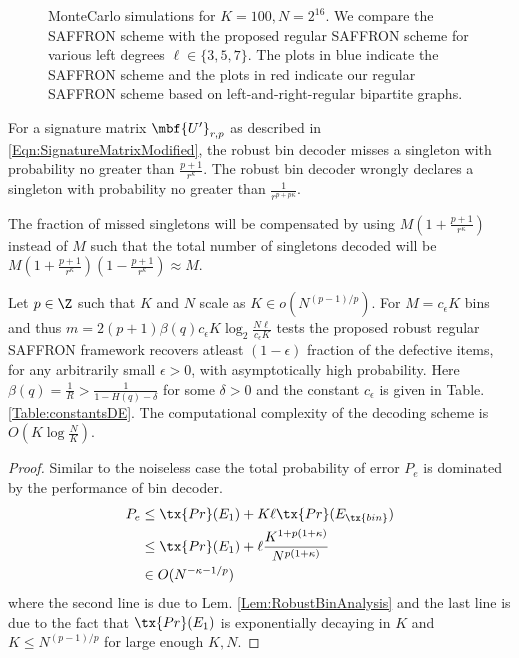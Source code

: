 \documentclass[conference,,twocolumn]{IEEEtran}
\newcommand*{\FigPath}{./Figures}
\def\ceps{c_{\epsilon}}
\begin{document}
\begin{figure}[t!]
\centering
\resizebox{\columnwidth}{!}{}
\caption{MonteCarlo simulations for $K=100, N=2^{16}$. We compare the SAFFRON scheme \cite{lee2015saffron} with the proposed regular SAFFRON scheme for various left degrees $\ell\in\{3,5,7\}$. 
The plots in blue indicate the SAFFRON scheme and the plots in red indicate our regular SAFFRON scheme based on left-and-right-regular bipartite graphs.}
\label{Fig:SimulationNoiseless}
\end{figure}

\begin{lemma}
\label{Lem:RobustBinAnalysis}
For a signature matrix $\mbf{U'}_{r,p}$ as described in \eqref{Eqn:SignatureMatrixModified}, the robust bin decoder misses a singleton with probability no greater than $\frac{p+1}{r^{\kappa}}$. The robust bin decoder wrongly declares a singleton with probability no greater than $\frac{1}{r^{p+p\kappa}}$.
\end{lemma}
The fraction of missed singletons will be compensated by using $M(1+\frac{p+1}{r^{\kappa}})$ instead of $M$ such that the total number of singletons decoded will be $M(1+\frac{p+1}{r^{\kappa}})(1-\frac{p+1}{r^{\kappa}})\approx M$.

\begin{theorem}
Let $p\in\Z$ such that $K$ and $N$ scale as $K\in o\left(N^{(p-1)/p}\right)$. For $M=\ceps K$ bins and thus $m=2(p+1)\beta(q)c_{\epsilon}K \log_{2}\frac{N\ell}{\ceps K}$ tests the proposed robust regular SAFFRON framework recovers atleast $(1-\epsilon)$ fraction of the defective items, for any arbitrarily small $\epsilon>0$, with asymptotically high probability.%
Here $\beta(q)=\frac{1}{R}>\frac{1}{1-H(q)-\delta}$ for some $\delta>0$ and the constant $c_{\epsilon}$ is given in Table. \ref{Table:constantsDE}. The computational complexity of the decoding scheme is $O(K\log \frac{N}{K})$.
\end{theorem}
\begin{proof}
Similar to the noiseless case the total probability of error $P_e$ is dominated by the performance of bin decoder. 
\begin{align*}
P_e &\leq  \tx{Pr}(E_1)+ K\ell\tx{Pr}(E_{\tx{bin}})\\
               &\leq \tx{Pr}(E_1)+ \ell \frac{K^{1+p(1+\kappa)}}{N^{p(1+\kappa)}}\\
               &\in O(N^{-\kappa-1/p})
\end{align*}
where the second line is due to Lem. \ref{Lem:RobustBinAnalysis} and the last line is due to the fact that $\tx{Pr}(E_1)$ is exponentially decaying in $K$ and $K\leq N^{(p-1)/p}$ for large enough $K,N$.
\end{proof}
\end{document}
